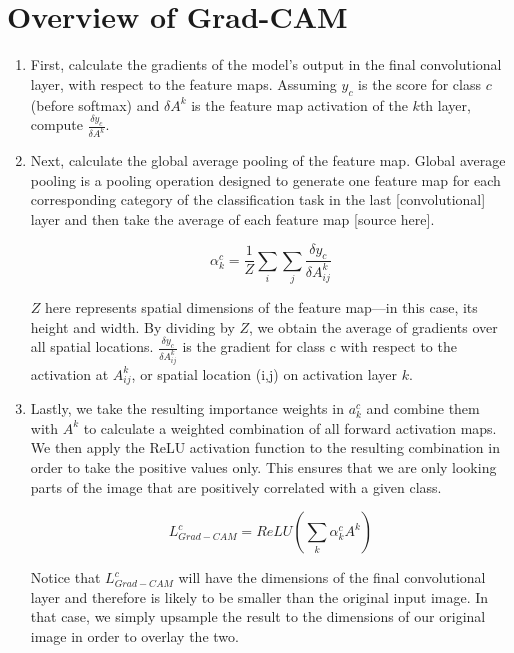 \documentclass [MAS] {uclathes}
\begin{document}
\section{Overview of Grad-CAM}
\begin{enumerate}
    \item First, calculate the gradients of the model’s output in the final convolutional layer, with respect to the 
    feature maps. Assuming \(y_{c}\) is the score for class \(c\) (before softmax) and \(\delta A^{k}\) is the feature 
    map activation of the \(k\)th layer, compute \(\frac{\delta y_{c}}{\delta A^{k}}\). 
    
    \item Next, calculate the global average pooling of the feature map. Global average pooling is a pooling operation 
    designed to generate one feature map for each corresponding category of the classification task in the last 
    [convolutional] layer and then take the average of each feature map [source here].
    
    \[\alpha_{k}^{c} = \frac{1}{Z}\sum_{i}\sum_{j}\frac{\delta y_{c}}{\delta A_{ij}^{k}}\]

    \(Z\) here represents spatial dimensions of the feature map---in this case, its height and width. By dividing by 
    \(Z\), we obtain the average of gradients over all spatial locations. \(\frac{\delta y_{c}}{\delta A_{ij}^{k}}\) is 
    the gradient for class c with respect to the activation at \(A_{ij}^{k}\), or spatial location (i,j) on activation 
    layer \(k\).
    
    \item Lastly, we take the resulting importance weights in \(a_{k}^{c}\) and combine them with \(A^{k}\) to calculate 
    a weighted combination of all forward activation maps. We then apply the ReLU activation function to the resulting 
    combination in order to take the positive values only. This ensures that we are only looking parts of the image that 
    are positively correlated with a given class.

    \[L_{Grad-CAM}^{c} = ReLU(\sum_{k}\alpha_{k}^{c}A^{k})\]

    Notice that \(L_{Grad-CAM}^{c}\) will have the dimensions of the final convolutional layer and therefore is likely 
    to be smaller than the original input image. In that case, we simply upsample the result to the dimensions of our 
    original image in order to overlay the two.
\end{enumerate}
\end{document}
